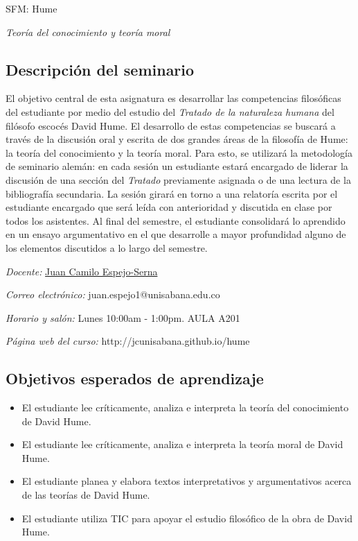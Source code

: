 \documentclass[]{article}
\date{}
\begin{document}
{ \huge SFM: Hume}\label{seminario-de-filosofuxeda-moderna-hume}

{ \large \emph{Teoría del conocimiento y teoría moral}}
\subsection{Descripción del
seminario}\label{descripciuxf3n-del-seminario}

El objetivo central de esta asignatura es desarrollar las competencias
filosóficas del estudiante por medio del estudio del \emph{Tratado de la
naturaleza humana} del filósofo escocés David Hume. El desarrollo de
estas competencias se buscará a través de la discusión oral y escrita de
dos grandes áreas de la filosofía de Hume: la teoría del conocimiento y
la teoría moral. Para esto, se utilizará la metodología de seminario
alemán: en cada sesión un estudiante estará encargado de liderar la
discusión de una sección del \emph{Tratado} previamente asignada o de
una lectura de la bibliografía secundaria. La sesión girará en torno a
una relatoría escrita por el estudiante encargado que será leída con
anterioridad y discutida en clase por todos los asistentes. Al final del
semestre, el estudiante consolidará lo aprendido en un ensayo
argumentativo en el que desarrolle a mayor profundidad alguno de los
elementos discutidos a lo largo del
semestre.

\emph{Docente:} \href{}{Juan Camilo Espejo-Serna}

\emph{Correo electrónico:} juan.espejo1@unisabana.edu.co

\emph{Horario y salón:} Lunes 10:00am - 1:00pm. AULA A201

\emph{Página web del curso:} http://jcunisabana.github.io/hume

\subsection{Objetivos esperados de
aprendizaje}\label{objetivos-esperados-de-aprendizaje}

\begin{itemize}
\item
  El estudiante lee críticamente, analiza e interpreta la teoría del
  conocimiento de David Hume.
\item
  El estudiante lee críticamente, analiza e interpreta la teoría moral
  de David Hume.
\item
  El estudiante planea y elabora textos interpretativos y argumentativos
  acerca de las teorías de David Hume.
\item
  El estudiante utiliza TIC para apoyar el estudio filosófico de la obra
  de David Hume.
\end{itemize}
\end{document}
